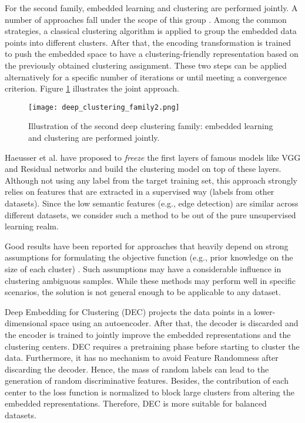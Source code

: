 \documentclass{article}
\begin{document}
For the second family, embedded learning and clustering are performed jointly. A number of approaches fall under the scope of this group \cite{paper28, paper27, paper29, paper35, paper36, paper24}. Among the common strategies, a classical clustering algorithm is applied to group the embedded data points into different clusters. After that, the encoding transformation is trained to push the embedded space to have a clustering-friendly representation based on the previously obtained clustering assignment. These two steps can be applied alternatively for a specific number of iterations or until meeting a convergence criterion. Figure \ref{fig:deep_clustering_family2} illustrates the joint approach. 

\begin{figure}[ht]
\vskip 0.2in
\begin{center}
\centerline{\texttt{[image: deep\_clustering\_family2.png]}}
\caption{Illustration of the second deep clustering family: embedded learning and clustering are performed jointly.}
\label{fig:deep_clustering_family2}
\end{center}
\vskip -0.2in
\end{figure}

Haeusser et al. \cite{paper21} have proposed to \textit{freeze} the first layers of famous models like VGG \cite{paper91} and Residual networks \cite{paper92} and build the clustering model on top of these layers. Although not using any label from the target training set, this approach strongly relies on features that are extracted in a supervised way (labels from other datasets). Since the low semantic features (e.g., edge detection) are similar across different datasets, we consider such a method to be out of the pure unsupervised learning realm.

Good results have been reported for approaches that heavily depend on strong assumptions for formulating the objective function (e.g., prior knowledge on the size of each cluster) \cite{paper36, paper30, paper73}. Such assumptions may have a considerable influence in clustering ambiguous samples. While these methods may perform well in specific scenarios, the solution is not general enough to be applicable to any dataset.  

Deep Embedding for Clustering (DEC) \cite{paper34} projects the data points in a lower-dimensional space using an autoencoder. After that, the decoder is discarded and the encoder is trained to jointly improve the embedded representations and the clustering centers. DEC requires a pretraining phase before starting to cluster the data. Furthermore, it has no mechanism to avoid Feature Randomness after discarding the decoder. Hence, the mass of random labels can lead to the generation of random discriminative features. Besides, the contribution of each center to the loss function is normalized to block large clusters from altering the embedded representations. Therefore, DEC is more suitable for balanced datasets.
\end{document}
